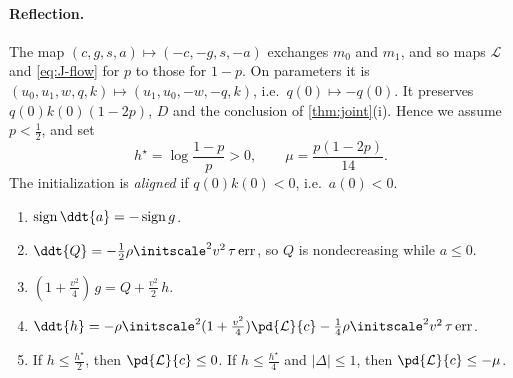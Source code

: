 \paragraph{Reflection.} The map $(c,g,s,a)\mapsto(-c,-g,s,-a)$ exchanges $m_0$ and $m_1$, and so maps $\mathcal L$ and \cref{eq:J-flow} for $p$ to those
for $1-p$. On parameters it is $(u_0,u_1,w,q,k)\mapsto(u_1,u_0,-w,-q,k)$, i.e.\ $q(0)\mapsto-q(0)$. It preserves $q(0)k(0)(1-2p)$, $D$ and the
conclusion of \cref{thm:joint}(i). Hence we assume $p<\frac{1}{2}$, and set
\[
 h^\star=\log\frac{1-p}{p}>0,\qquad \mu=\frac{p(1-2p)}{14}.
\]
The initialization is \emph{aligned} if $q(0)k(0)<0$, i.e.\ $a(0)<0$.

\begin{lemma}
\label{lem:J-drift}
\begin{enumerate}[label=(\alph*),leftmargin=*,itemsep=2pt,topsep=3pt]
\item $\operatorname{sign}\ddt{a}=-\operatorname{sign}g$.
\item $\ddt{Q}=-\frac{1}{2}\rho\initscale^2v^2\,\tau\,\mathrm{err}$, so $Q$ is nondecreasing while $a\le0$.
\item $(1+\frac{v^2}{4})\,g=Q+\frac{v^2}{2}\,h$.
\item $\ddt{h}=-\rho\initscale^2(1+\frac{v^2}{4})\pd{\mathcal L}{c}-\frac{1}{4}\rho\initscale^2v^2\,\tau\,\mathrm{err}$.
\item If $h\le\frac{h^\star}{2}$, then $\pd{\mathcal L}{c}\le0$. If $h\le\frac{h^\star}{4}$ and $|\Delta|\le1$, then $\pd{\mathcal L}{c}\le-\mu$.
\end{enumerate}
\end{lemma}

